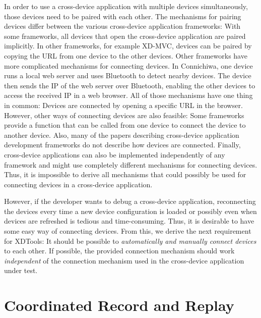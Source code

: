 In order to use a cross-device application with multiple devices simultaneously, those devices need to be paired with each other. The mechanisms for pairing devices differ between the various cross-device application frameworks: With some frameworks, all devices that open the cross-device application are paired implicitly. In other frameworks, for example XD-MVC, devices can be paired by copying the URL from one device to the other devices. Other frameworks have more complicated mechanisms for connecting devices. In Connichiwa, one device runs a local web server and uses Bluetooth to detect nearby devices. The device then sends the IP of the web server over Bluetooth, enabling the other devices to access the received IP in a web browser. All of those mechanisms have one thing in common: Devices are connected by opening a specific URL in the browser. However, other ways of connecting devices are also feasible: Some frameworks provide a function that can be called from one device to connect the device to another device. Also, many of the papers describing cross-device application development frameworks do not describe how devices are connected. Finally, cross-device applications can also be implemented independently of any framework and might use completely different mechanisms for connecting devices. Thus, it is impossible to derive all mechanisms that could possibly be used for connecting devices in a cross-device application.

However, if the developer wants to debug a cross-device application, reconnecting the devices every time a new device configuration is loaded or possibly even when devices are refreshed is tedious and time-consuming. Thus, it is desirable to have some easy way of connecting devices. From this, we derive the next requirement for XDTools: It should be possible to \emph{automatically and manually connect devices} to each other. If possible, the provided connection mechanism should work \emph{independent} of the connection mechanism used in the cross-device application under test.

\section{Coordinated Record and Replay}

